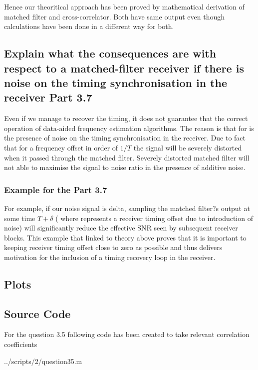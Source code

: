Hence our theoritical approach has been proved by mathematical derivation of matched filter and cross-correlator. Both have same output even though calculations have been done in a different way for both.
	
\subsection{ Explain what the consequences are with respect to a matched-filter receiver if there is noise on the timing synchronisation in the receiver Part 3.7}
 
Even if we manage to recover the timing, it does not guarantee that the correct operation of data-aided frequency estimation algorithms. The reason is that for is the presence of noise on the timing synchronisation in the receiver. Due to fact that for a frequency offset in order of $1/T$ the signal will be severely distorted when it passed through the matched filter. Severely distorted matched filter will not able to maximise the signal to noise ratio in the presence of additive noise.

\subsubsection{Example for the Part 3.7}

For example, if our noise signal is delta, sampling the matched filter?s output at some time $T+\delta$ ( where  represents a receiver timing offset due to introduction of noise) will significantly reduce the effective SNR seen by subsequent receiver blocks. This example that linked to theory above proves that it is important to keeping receiver timing offset close to zero as possible and thus delivers motivation for the inclusion of a timing recovery loop in the receiver.
\subsection{Plots}

\subsection{Source Code}
For the question 3.5 following code has been created to take relevant correlation coefficients
\begin{lstinputlisting}[language=Octave]{../scripts/2/question35.m}
\end{lstinputlisting}

